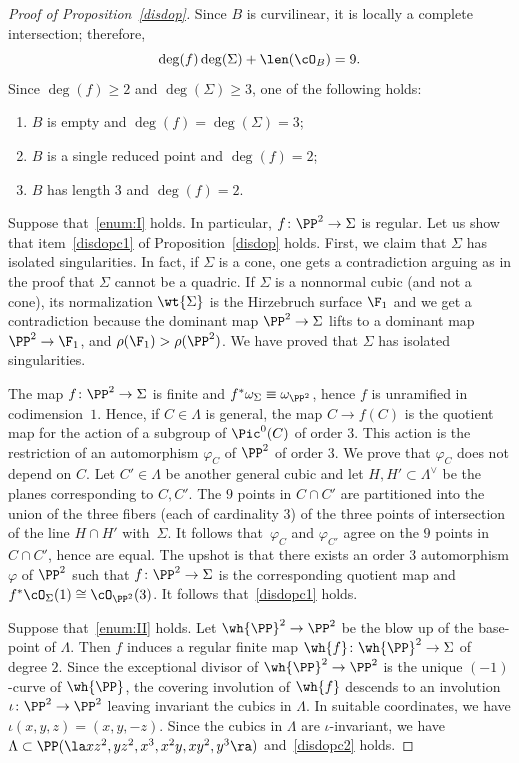 \begin{proof}[Proof of Proposition~\ref{disdop}]
Since $B$ is curvilinear, it is locally a complete intersection; therefore,\vspace*{-3pt}\enlargethispage{1\baselineskip}%
\[
\deg( f)\deg (\Sigma)+\len(\cO_{B})=9.\vspace*{-3pt}
\]
Since $\deg (f)\ge 2$ and $\deg( \Sigma)\ge 3$, one of the following holds:
\begin{enumerate}\renewcommand{\theenumi}{\Roman{enumi}}
\item\label{enum:I}
$ B$ is empty and $\deg( f)=\deg(\Sigma)=3$;
\item\label{enum:II}
$ B$ is a single reduced point and $\deg( f)=2$;
\item\label{enum:III}
$ B$ has length $3$ and $\deg( f)=2$.
\end{enumerate}
Suppose that~\eqref{enum:I} holds. In particular, $f\colon \PP^2 \to\Sigma$ is regular. Let us show that item~\eqref{disdopc1} of Proposition~\ref{disdop} holds. First, we claim that $\Sigma$ has isolated singularities. In fact, if $\Sigma$ is a cone, one gets a contradiction arguing as in the proof that $\Sigma$ cannot be a quadric. If $\Sigma$ is a nonnormal cubic (and not a cone), its normalization $\wt{\Sigma}$ is the Hirzebruch surface $\F_1$ and we get a contradiction because the dominant map $\PP^2\to\Sigma$ lifts to a dominant map $\PP^2\to \F_1$, and $\rho(\F_1)>\rho(\PP^2)$.
We have proved that $\Sigma$ has isolated singularities.

The map $f\colon\PP^2\to\Sigma$ is finite and $f^{*}\omega_{\Sigma}\equiv\omega_{\PP^2}$, hence $f$ is unramified in codimension~$1$. Hence, if $C\in\Lambda$ is general, the map $C\to f(C)$ is the quotient map for the action of a subgroup of $\Pic^0(C)$ of order $3$. This action is the restriction of an automorphism $\varphi_C$ of $\PP^2$ of order $3$. We prove that $\varphi_C$ does not depend on $C$. Let $C'\in\Lambda$ be another general cubic and let $H,H'\subset\Lambda^{\!\vee}$ be the planes corresponding to $C,C'$. The $9$ points in $C\cap C'$ are partitioned into the union of the three fibers (each of cardinality $3$) of the three points of intersection of the line $H\cap H'$ with~$\Sigma$. It follows that~$\varphi_C$ and $\varphi_{C'}$ agree on the $9$ points in $C\cap C'$, hence are equal. The upshot is that there exists an order $3$ automorphism $\varphi$ of $\PP^2$ such that $f\colon\PP^2\to\Sigma$ is the corresponding quotient map and $f^{*}\cO_{\Sigma}(1)\cong\cO_{\PP^2}(3)$. It follows that~\eqref{disdopc1} holds.

Suppose that~\eqref{enum:II} holds. Let $\wh{\PP}^2\to\PP^2$ be the blow up of the base-point of $\Lambda$. Then $f$ induces a regular finite map
$\wh{f}\colon \wh{\PP}^2\to \Sigma$ of degree $2$. Since the exceptional divisor of $\wh{\PP}^2\to\PP^2$ is the unique $(-1)$-curve of $\wh{\PP}$, the covering involution of $\wh{f}$ descends to an involution $\iota\colon\PP^2\to\PP^2$ leaving invariant the cubics in $\Lambda$. In suitable coordinates, we have
$\iota(x,y,z)=(x,y,-z)$. Since the cubics in $\Lambda$ are ${\iota}$-invariant, we have
$\Lambda\subset\PP(\la xz^2,yz^2,x^3,x^2y,xy^2,y^3\ra)$ and~\eqref{disdopc2} holds.


\end{proof}

